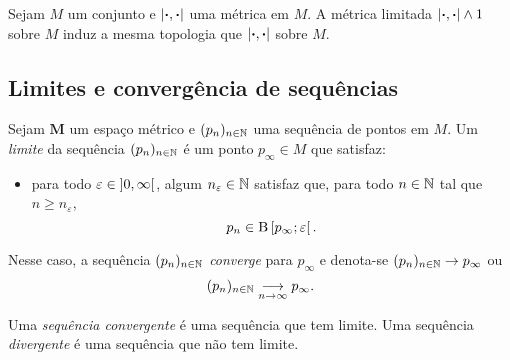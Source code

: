 \begin{exercise}
Sejam $M$ um conjunto e $\left\vert{\bm{\cdot}},{\bm{\cdot}}\right\vert$ uma métrica em $M$. A métrica limitada $\left\vert{\bm{\cdot}},{\bm{\cdot}}\right\vert \mathbin{\wedge} 1$ sobre $M$ induz a mesma topologia que $\left\vert{\bm{\cdot}},{\bm{\cdot}}\right\vert$ sobre $M$.
\end{exercise}

\subsection{Limites e convergência de sequências}


\begin{definition}
Sejam $\bm M$ um espaço métrico e $(p_n)_{n \in \mathbb{N}}$ uma sequência de pontos em $M$. Um \emph{limite} da sequência $(p_n)_{n \in \mathbb{N}}$ é um ponto $p_\infty \in M$ que satisfaz:
	\begin{itemize}
	\item para todo $\varepsilon \in \left]{0},{\infty}\right[$, algum $n_\varepsilon \in \mathbb{N}$ satisfaz que, para todo $n \in \mathbb{N}$ tal que $n \geq n_\varepsilon$,
		\begin{equation*}
		p_n \in \mathrm{B}\left[{p_\infty};{\varepsilon}\right[.
		\end{equation*}
	\end{itemize}
Nesse caso, a sequência $(p_n)_{n \in \mathbb{N}}$ \emph{converge} para $p_\infty$ e denota-se $(p_n)_{n \in \mathbb{N}} \rightarrow p_\infty$ ou
	\begin{equation*}
	(p_n)_{n \in \mathbb{N}} \underset{n \to \infty}{\longrightarrow} p_\infty.
	\end{equation*}

Uma \emph{sequência convergente} é uma sequência que tem limite. Uma sequência \emph{divergente} é uma sequência que não tem limite.
\end{definition}

